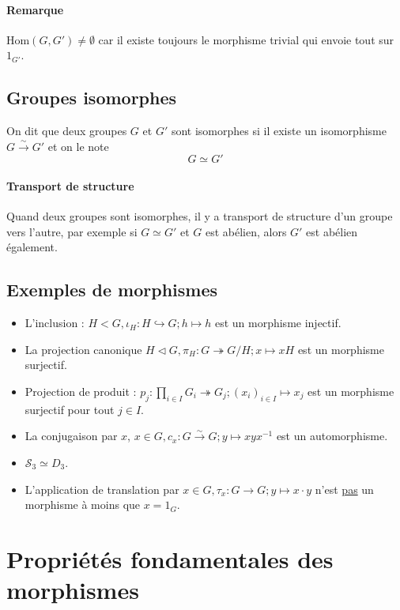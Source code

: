\documentclass[a4paper,10pt]{report}
\newcommand{\inj}{\hookrightarrow}
\newcommand{\surj}{\twoheadrightarrow}
\newcommand{\bij}{\overset{\sim}{\to}} %
\begin{document}
    \paragraph{Remarque}
    $\text{Hom}(G,G') \neq \emptyset$ car il existe toujours le morphisme trivial
    qui envoie tout sur $1_{G'}$.

   \subsection{Groupes isomorphes}
    On dit que deux groupes $G$ et $G'$ sont isomorphes si il existe un
    isomorphisme $G \bij G'$ et on le note $$G \simeq G'$$

    \paragraph{Transport de structure} Quand deux groupes sont isomorphes,
    il y a transport de structure d'un groupe vers l'autre, par exemple si
    $G \simeq G'$ et $G$ est abélien, alors $G'$ est abélien également.

   \subsection{Exemples de morphismes}
    \begin{itemize}
     \item L'inclusion : $H < G, \iota_H : H \inj G; h \mapsto h$ est
       un morphisme injectif.
     \item La projection canonique $H \triangleleft G, \pi_H: G \surj G/H;
       x \mapsto xH$ est un morphisme surjectif.
     \item Projection de produit : $p_j : \displaystyle \prod_{i\in I}
       G_i \surj G_j ; (x_i)_{i \in I} \mapsto x_j$ est un morphisme
       surjectif pour tout $j \in I$.
     \item La conjugaison par $x$, $x \in G, c_x : G \bij G ; y \mapsto
       xyx^{-1}$ est un automorphisme.
     \item $\mathcal{S}_3 \simeq D_3$.  \item L'application de translation
       par $x \in G, \tau_x : G \to G; y \mapsto x\cdot y$ n'est
       \underline{pas} un morphisme à moins que $x= 1_G$.
    \end{itemize}

  \section{Propriétés fondamentales des morphismes}
\end{document}
